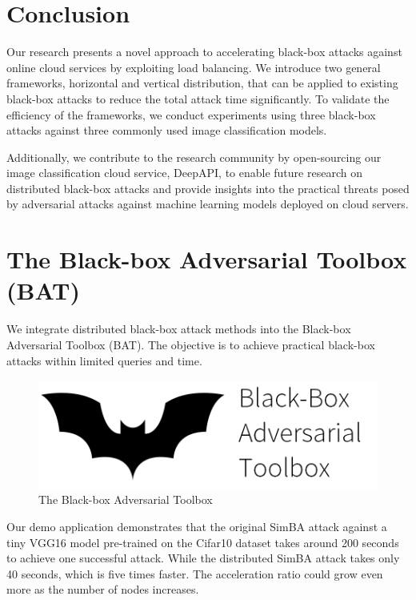 \section{Conclusion}

Our research presents a novel approach to accelerating black-box attacks against online cloud services by exploiting load balancing. We introduce two general frameworks, horizontal and vertical distribution, that can be applied to existing black-box attacks to reduce the total attack time significantly. To validate the efficiency of the frameworks, we conduct experiments using three black-box attacks against three commonly used image classification models.

Additionally, we contribute to the research community by open-sourcing our image classification cloud service, DeepAPI, to enable future research on distributed black-box attacks and provide insights into the practical threats posed by adversarial attacks against machine learning models deployed on cloud servers.

\clearpage

\section{The Black-box Adversarial Toolbox (BAT)}
\label{sec:bat}

We integrate distributed black-box attack methods into the Black-box Adversarial Toolbox (BAT). The objective is to achieve practical black-box attacks within limited queries and time.

\begin{figure}[H]
\centering
\includegraphics[scale=0.35]{figures/chapter_classification/bat.png}
\caption{The Black-box Adversarial Toolbox}
\label{fig.bat}
\end{figure}

Our demo application demonstrates that the original SimBA attack against a tiny VGG16 model pre-trained on the Cifar10 dataset takes around 200 seconds to achieve one successful attack. While the distributed SimBA attack takes only 40 seconds, which is five times faster. The acceleration ratio could grow even more as the number of nodes increases.

